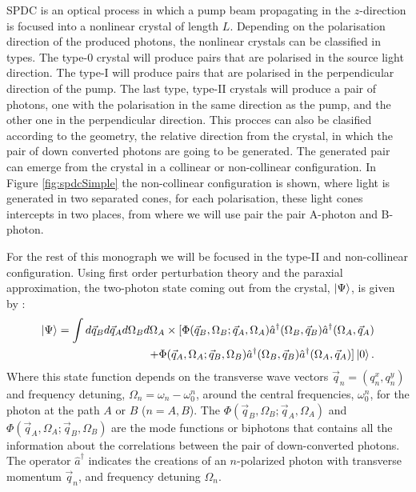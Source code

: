 SPDC is an optical process in which a pump beam propagating in the $z$-direction is focused into a nonlinear crystal of length $L$. 
Depending on the polarisation direction of the produced photons, the nonlinear crystals 
can be classified in types. 
The type-0 crystal will produce pairs that are polarised in the source light direction. 
The type-I will produce pairs that are polarised in the perpendicular direction of the pump. 
The last type, type-II crystals will produce a pair of photons, 
one with the polarisation in the same direction as the pump, 
and the other one in the perpendicular direction. 
This procces can also be clasified according to the geometry, the relative direction from the crystal,
 in which the pair of down converted photons are going to be generated. The generated
 pair can emerge from the crystal in a collinear or non-collinear configuration. 
In Figure \ref{fig:spdcSimple} the non-collinear configuration is shown, where light is generated in two separated 
cones, for each polarisation, these light cones intercepts in two places, from where we will use pair the pair A-photon and B-photon.

For the rest of this monograph we will be focused in the type-II and non-collinear configuration. Using first order perturbation theory  and the paraxial approximation, the two-photon state
 coming out from the crystal, $\ket{\Psi}$, is given by \cite{omar}:
\begin{equation}
\begin{split}
\label{eq:stateFunComplex}
\ket{\Psi}=\int d\vec{q}_B d\vec{q}_A d\Omega_B d\Omega_A 
\times [\Phi(\vec{q}_B,\Omega_B;\vec{q}_A,\Omega_A) \hat{a}^{\dagger} (\Omega_B,\vec{q}_B) \hat{a}^{\dagger}(\Omega_A,\vec{q}_A) \\
+ \Phi(\vec{q}_A,\Omega_A;\vec{q}_B,\Omega_B) \hat{a}^{\dagger}(\Omega_B,\vec{q}_B) \hat{a}^{\dagger}(\Omega_A,\vec{q}_A)]   \ket{0}.  
\end{split}
\end{equation}
Where this state function depends on the transverse wave vectors $\vec{q}_n=(q_n^x,q_n^y)$ and frequency detuning, $\Omega_n=\omega_n-\omega_0^n$, 
around the central frequencies, $\omega_0^n$, for the photon at the path $A$ or $B$ ($n=A,B$).
The $\Phi(\vec{q}_B,\Omega_B;\vec{q}_A,\Omega_A)$ and $\Phi(\vec{q}_A,\Omega_A;\vec{q}_B,\Omega_B)$
are the mode functions or biphotons that contains all the information about the correlations
between the pair of down-converted photons. The operator $\hat{a}^{\dagger}$ indicates the creations of an $n$-polarized photon with transverse momentum $\vec{q}_n$, 
and frequency detuning $\Omega_n$. \\

